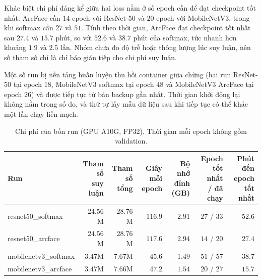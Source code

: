 \documentclass[a4paper,12pt]{article}
\begin{document}
Khác biệt chi phí đáng kể giữa hai loss nằm ở số epoch cần để đạt checkpoint tốt nhất. ArcFace cần $14$ epoch với ResNet-50 và $20$ epoch với MobileNetV3, trong khi softmax cần $27$ và $51$. Tính theo thời gian, ArcFace đạt checkpoint tốt nhất sau $27.4$ và $15.7$ phút, so với $52.6$ và $38.7$ phút của softmax, tức nhanh hơn khoảng $1.9$ và $2.5$ lần. Nhóm chưa đo độ trễ hoặc thông lượng lúc suy luận, nên số tham số chỉ là chỉ báo gián tiếp cho chi phí suy luận.

Một số run bị nền tảng huấn luyện thu hồi container giữa chừng (hai run ResNet-50 tại epoch $18$, MobileNetV3 softmax tại epoch $48$ và MobileNetV3 ArcFace tại epoch $26$) và được tiếp tục từ bản backup gần nhất. Thời gian khởi động lại không nằm trong số đo, và thứ tự lấy mẫu dữ liệu sau khi tiếp tục có thể khác một lần chạy liền mạch.

\begin{table}[!htbp]
    \centering
    \small
    \caption{Chi phí của bốn run (GPU A10G, FP32). Thời gian mỗi epoch không gồm validation.}
    \label{tab:cost}
    \begin{adjustbox}{max width=\linewidth}
        \begin{tabular}{lrrrrrr}
            \toprule
            Run                  & \shortstack{Tham số\\suy luận} & \shortstack{Tham số\\tổng} & \shortstack{Giây\\mỗi epoch} & \shortstack{Bộ nhớ\\đỉnh (GB)} & \shortstack{Epoch tốt nhất\\/ đã chạy} & \shortstack{Phút đến\\epoch tốt nhất} \\
            \midrule
            resnet50\_softmax    & $24.56$M                       & $28.76$M                   & $116.9$                      & $2.91$                         & $27$ / $33$                            & $52.6$                                \\
            resnet50\_arcface    & $24.56$M                       & $28.76$M                   & $117.6$                      & $2.94$                         & $14$ / $20$                            & $27.4$                                \\
            mobilenetv3\_softmax & $3.47$M                        & $7.67$M                    & $45.6$                       & $1.49$                         & $51$ / $57$                            & $38.7$                                \\
            mobilenetv3\_arcface & $3.47$M                        & $7.66$M                    & $47.2$                       & $1.54$                         & $20$ / $27$                            & $15.7$                                \\
            \bottomrule
        \end{tabular}
    \end{adjustbox}
\end{table}
\end{document}
